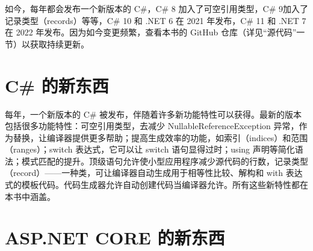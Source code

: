 如今，每年都会发布一个新版本的 C\#，C\# 8 加入了可空引用类型，C\# 9加入了记录类型（records）等等，C\# 10 和 .NET 6 在 2021 年发布，C\# 11 和 .NET 7 在 2022 年发布。因为如今变更频繁，查看本书的 GitHub 仓库（详见“源代码”一节）以获取持续更新。

\section*{C\# 的新东西}
每年，一个新版本的 C\# 被发布，伴随着许多新功能特性可以获得。最新的版本包括很多功能特性：可空引用类型，去减少 NullableReferenceException 异常，作为替换，让编译器提供更多帮助；提高生成效率的功能，如索引（indices）和范围（ranges）；switch 表达式，它可以让 switch 语句显得过时；using 声明等简化语法；模式匹配的提升。顶级语句允许使小型应用程序减少源代码的行数，记录类型（record）——一种类，可让编译器自动生成用于相等性比较、解构和 with 表达式的模板代码。代码生成器允许自动创建代码当编译器允许。所有这些新特性都在本书中涵盖。

\section*{ASP.NET CORE 的新东西}